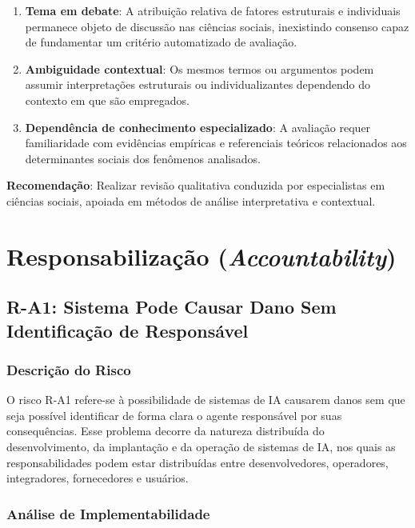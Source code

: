 \begin{enumerate}
    \item \textbf{Tema em debate}: A atribuição relativa de fatores estruturais e individuais permanece objeto de discussão nas ciências sociais, inexistindo consenso capaz de fundamentar um critério automatizado de avaliação.

    \item \textbf{Ambiguidade contextual}: Os mesmos termos ou argumentos podem assumir interpretações estruturais ou individualizantes dependendo do contexto em que são empregados.

    \item \textbf{Dependência de conhecimento especializado}: A avaliação requer familiaridade com evidências empíricas e referenciais teóricos relacionados aos determinantes sociais dos fenômenos analisados.
\end{enumerate}

\textbf{Recomendação}: Realizar revisão qualitativa conduzida por especialistas em ciências sociais, apoiada em métodos de análise interpretativa e contextual.

\section{Responsabilização (\textit{Accountability})}

\subsection{R-A1: Sistema Pode Causar Dano Sem Identificação de Responsável}

\subsubsection{Descrição do Risco}

O risco R-A1 refere-se à possibilidade de sistemas de IA causarem danos sem que seja possível identificar de forma clara o agente responsável por suas consequências. Esse problema decorre da natureza distribuída do desenvolvimento, da implantação e da operação de sistemas de IA, nos quais as responsabilidades podem estar distribuídas entre desenvolvedores, operadores, integradores, fornecedores e usuários.

\subsubsection{Análise de Implementabilidade}

